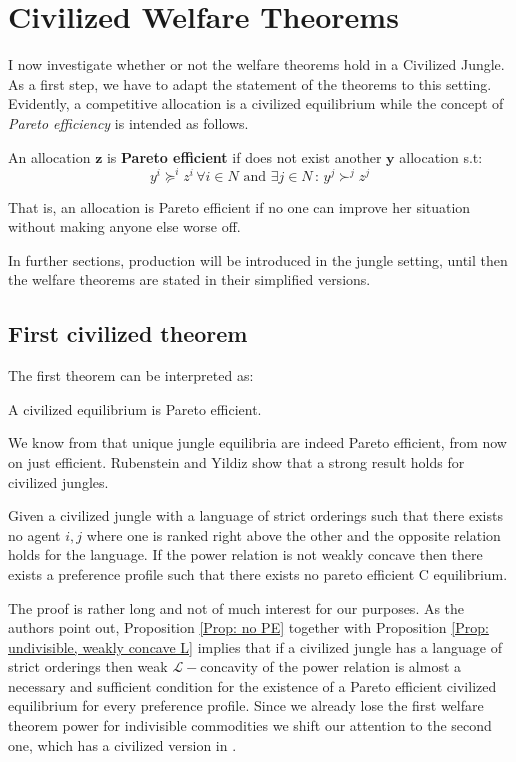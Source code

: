 \section{Civilized Welfare Theorems}

I now investigate whether or not the welfare theorems hold in a Civilized Jungle. As a first step, we have to adapt the statement of the theorems to this setting. Evidently, a competitive allocation is a civilized equilibrium while the concept of \textit{Pareto efficiency} is intended as follows.

\begin{definition}
    An allocation $\textbf{z}$ is \textbf{Pareto efficient} if does not exist another $\textbf{y}$ allocation s.t:
    \[y^i\succeq^iz^i\,\forall i\in N \text{ and } \exists j\in N \,: \,y^j\succ^jz^j \]
\end{definition}

That is, an allocation is Pareto efficient if no one can improve her situation without making anyone else worse off. 

In further sections, production will be introduced in the jungle setting, until then the welfare theorems are stated in their simplified versions.

\subsection{First civilized theorem}

The first theorem can be interpreted as:

\begin{center}
    A civilized equilibrium is Pareto efficient.
\end{center}

We know from \cite*[PR]{P-R} that unique jungle equilibria are indeed Pareto efficient, from now on just efficient. Rubenstein and Yildiz \cite[RY]{RY} show that a strong result holds for civilized jungles.

\begin{proposition}\label{Prop: no PE}
    Given a civilized jungle with a language of strict orderings such that there exists no agent $i,j$ where one is ranked right above the other and the opposite relation holds for the language. If the power relation is not weakly concave then there exists a preference profile such that there exists no pareto efficient C equilibrium. 
\end{proposition}

The proof is rather long and not of much interest for our purposes. As the authors point out, Proposition \ref{Prop: no PE} together with Proposition \ref{Prop: undivisible, weakly concave L} implies that if a civilized jungle has a language of strict orderings then weak $\mathcal{L}-$concavity of the power relation is almost a necessary and sufficient condition for the existence of a Pareto efficient civilized equilibrium for every preference profile.  
Since we already lose the first welfare theorem power for indivisible commodities we shift our attention to the second one, which has a civilized version in \cite[PR]{P-R}.

